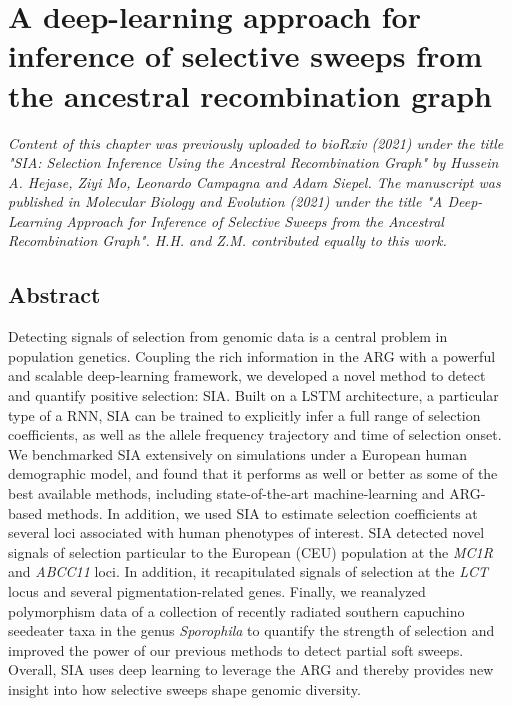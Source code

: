 \chapter{A deep-learning approach for inference of selective sweeps from the ancestral recombination graph}

\textit{Content of this chapter was previously uploaded to bioRxiv (2021) under the title "SIA: Selection Inference Using the Ancestral Recombination Graph" by Hussein A. Hejase, Ziyi Mo, Leonardo Campagna and Adam Siepel. The manuscript was published in Molecular Biology and Evolution (2021) under the title "A Deep-Learning Approach for Inference of Selective Sweeps from the Ancestral Recombination Graph". H.H. and Z.M. contributed equally to this work.}

\section{Abstract}

Detecting signals of selection from genomic data is a central problem in population genetics. Coupling the rich information in the \acf{ARG} with a powerful and scalable deep-learning framework, we developed a novel method to detect and quantify positive selection: \acf{SIA}. Built on a \ac{LSTM} architecture, a particular type of a \ac{RNN}, SIA can be trained to explicitly infer a full range of selection coefficients, as well as the allele frequency trajectory and time of selection onset. We benchmarked \ac{SIA} extensively on simulations under a European human demographic model, and found that it performs as well or better as some of the best available methods, including state-of-the-art machine-learning and \ac{ARG}-based methods. In addition, we used \ac{SIA} to estimate selection coefficients at several loci associated with human phenotypes of interest. \ac{SIA} detected novel signals of selection particular to the European (CEU) population at the \textit{MC1R} and \textit{ABCC11} loci. In addition, it recapitulated signals of selection at the \textit{LCT} locus and several pigmentation-related genes. Finally, we reanalyzed polymorphism data of a collection of recently radiated southern capuchino seedeater taxa in the genus \textit{Sporophila} to quantify the strength of selection and improved the power of our previous methods to detect partial soft sweeps. Overall, \ac{SIA} uses deep learning to leverage the \ac{ARG} and thereby provides new insight into how selective sweeps shape genomic diversity.

